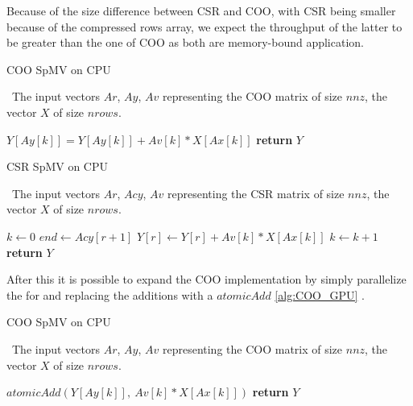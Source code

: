 \documentclass[conference]{IEEEtran}
\begin{document}
Because of the size difference between CSR and COO, with CSR being smaller because of the compressed rows array, we expect the throughput of the latter to be greater than the one of COO as both are memory-bound application.

\begin{algorithm}[h!]
	\caption{COO SpMV on CPU}
	\algorithmicrequire~The input vectors $Ar$, $Ay$, $Av$ representing the COO matrix of size $nnz$, the vector $X$ of size $nrows$.
	\begin{algorithmic}[1]
		\State $Y[Ay[k]] = Y[Ay[k]] + Av[k] * X[Ax[k]] $\label{partitioning}
		\EndFor
		\State \textbf{return} $Y$
		\EndProcedure
	\end{algorithmic}
	\label{alg:COO_CPU}
\end{algorithm}

\begin{algorithm}[h!]
	\caption{CSR SpMV on CPU}
	\algorithmicrequire~The input vectors $Ar$, $Acy$, $Av$ representing the CSR matrix of size $nnz$, the vector $X$ of size $nrows$.
	\begin{algorithmic}[1]
		\State $k \leftarrow 0$
		\State $end \leftarrow Acy[r + 1]$
		\State $Y[r] \leftarrow Y[r] + Av[k] * X[Ax[k]] $\label{partitioning}
		\State $k \leftarrow k + 1$
		\EndWhile
		\EndFor
		\State \textbf{return} $Y$
		\EndProcedure
	\end{algorithmic}
	\label{alg:CSR_CPU}
\end{algorithm}

After this it is possible to expand the COO implementation by simply parallelize the for and replacing the additions with a $atomicAdd$ \ref{alg:COO_GPU} .

\begin{algorithm}[h!]
	\caption{COO SpMV on CPU}\textsc{}
	\algorithmicrequire~The input vectors $Ar$, $Ay$, $Av$ representing the COO matrix of size $nnz$, the vector $X$ of size $nrows$.
	\begin{algorithmic}[1]
		\State $atomicAdd(Y[Ay[k]],\ Av[k] * X[Ax[k]]) $\label{partitioning}
		\EndFor
		\State \textbf{return} $Y$
		\EndProcedure
	\end{algorithmic}
	\label{alg:COO_GPU}
\end{algorithm}
\end{document}
